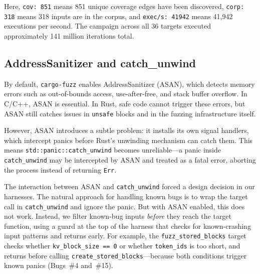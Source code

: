 Here, \texttt{cov: 851} means 851 unique coverage edges have been discovered, \texttt{corp: 318} means 318 inputs are in the corpus, and \texttt{exec/s: 41942} means 41,942 executions per second. The campaign across all 36 targets executed approximately 141 million iterations total.

\subsection{AddressSanitizer and catch\_unwind}

%
By default, \texttt{cargo-fuzz} enables AddressSanitizer (ASAN), which detects memory errors such as out-of-bounds access, use-after-free, and stack buffer overflow. In C/C++, ASAN is essential. In Rust, safe code cannot trigger these errors, but ASAN still catches issues in \texttt{unsafe} blocks and in the fuzzing infrastructure itself.

However, ASAN introduces a subtle problem: it installs its own signal handlers, which intercept panics before Rust's unwinding mechanism can catch them. This means \texttt{std::panic::catch\_unwind} becomes unreliable---a panic inside \texttt{catch\_unwind} may be intercepted by ASAN and treated as a fatal error, aborting the process instead of returning \texttt{Err}.

\begin{notebox}
The interaction between ASAN and \texttt{catch\_unwind} forced a design decision in our harnesses. The natural approach for handling known bugs is to wrap the target call in \texttt{catch\_unwind} and ignore the panic. But with ASAN enabled, this does not work. Instead, we filter known-bug inputs \emph{before} they reach the target function, using a guard at the top of the harness that checks for known-crashing input patterns and returns early. For example, the \texttt{fuzz\_stored\_blocks} target checks whether \texttt{kv\_block\_size == 0} or whether \texttt{token\_ids} is too short, and returns before calling \texttt{create\_stored\_blocks}---because both conditions trigger known panics (Bugs~\#4 and~\#15).
\end{notebox}

